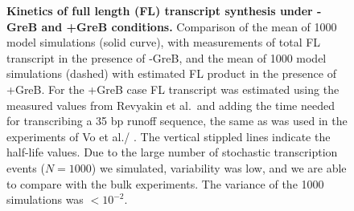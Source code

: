 \documentclass{bmcart}
\begin{document}
\begin{backmatter}
\begin{figure}[h!]
    \begin{center}
    \end{center}
    \caption{ {\bf Kinetics of full length (FL) transcript synthesis under
      -GreB and +GreB conditions.}
      Comparison of the mean of 1000 model simulations (solid curve), with
      measurements \citep[squares, ][]{vo_vitro_2003-1} of total FL transcript
      in the presence of -GreB, and the mean of 1000 model simulations (dashed)
      with estimated FL product in the presence of +GreB. For the +GreB case FL
      transcript was estimated using the measured values from Revyakin et al.\
      and adding the time needed for transcribing a 35 bp runoff sequence, the
      same as was used in the experiments of Vo et al./
      \cite{vo_vitro_2003-1}. The vertical stippled lines indicate the
      half-life values. Due to the large number of stochastic transcription
      events ($N=1000$) we simulated, variability was low, and we are able to
      compare with the bulk experiments. The variance of the 1000 simulations
      was $<10^{-2}$.}
  \label{fig:vo_comparison}
\end{figure}


\end{backmatter}
\end{document}
